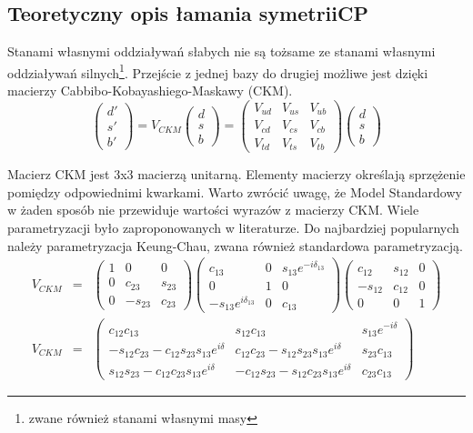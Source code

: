 \subsection{Teoretyczny opis łamania symetrii\textbf{CP} }

Stanami własnymi oddziaływań słabych nie są tożsame ze stanami własnymi oddziaływań silnych\footnote{zwane również stanami własnymi masy}. Przejście z jednej bazy do drugiej możliwe jest dzięki macierzy Cabbibo-Kobayashiego-Maskawy (CKM).
\begin{equation}
\begin{pmatrix}
d'\\ s' \\b'
\end{pmatrix} =V_{CKM} 
\begin{pmatrix}
d\\ s \\b
\end{pmatrix}=\begin{pmatrix}
V_{ud}& V_{us}&V_{ub}\\ V_{cd}& V_{cs}&V_{cb} \\ V_{td}& V_{ts}&V_{tb}
\end{pmatrix} \begin{pmatrix}
d\\ s \\b
\end{pmatrix}
\end{equation}

Macierz CKM jest 3x3 macierzą unitarną. Elementy macierzy określają sprzężenie pomiędzy odpowiednimi kwarkami. Warto zwrócić uwagę, że Model Standardowy w żaden sposób nie przewiduje wartości wyrazów z macierzy CKM. 
Wiele parametryzacji było zaproponowanych w literaturze. Do najbardziej popularnych należy parametryzacja Keung-Chau, zwana również standardowa parametryzacją. 
\begin{eqnarray}
V_{CKM}&=&\begin{pmatrix} 1 & 0 & 0 \\ 0 & c_{23} & s_{23} \\ 0 & -s_{23} & c_{23} \end{pmatrix}
 \begin{pmatrix} c_{13} & 0 & s_{13}e^{-i\delta_{13}} \\ 0 & 1 & 0 \\ -s_{13}e^{i\delta_{13}} & 0 & c_{13} \end{pmatrix}
 \begin{pmatrix} c_{12} & s_{12} & 0 \\ -s_{12} & c_{12} & 0 \\ 0 & 0 & 1 \end{pmatrix} \nonumber \\
V_{CKM}&=&\begin{pmatrix}
c_{12}c_{13}&s_{12}c_{13}& s_{13}e^{-i\delta} \\
 -s_{12}c_{23}-c_{12}s_{23}s_{13}e^{i\delta} & c_{12}c_{23}-s_{12}s_{23}s_{13}e^{i\delta}  & s_{23}c_{13}\\ s_{12}s_{23}-c_{12}c_{23}s_{13}e^{i\delta} & -c_{12}s_{23}-s_{12}c_{23}s_{13}e^{i\delta} & c_{23}c_{13}
\end{pmatrix}
\end{eqnarray}

